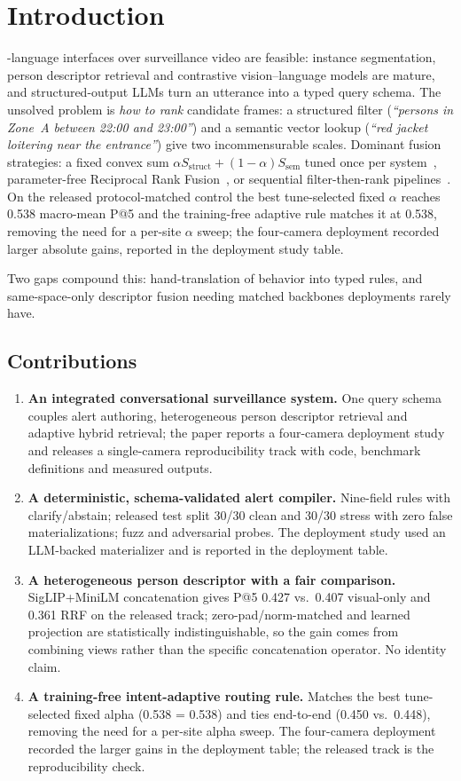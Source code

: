 ﻿\documentclass[conference]{IEEEtran}
\theoremstyle{plain}
\begin{document}
\section{Introduction}

-language interfaces over surveillance video are feasible: instance segmentation, person descriptor retrieval and contrastive vision--language models are mature, and structured-output LLMs turn an utterance into a typed query schema. The unsolved problem is \emph{how to rank} candidate frames: a structured filter (\textit{``persons in Zone~A between 22:00 and 23:00''}) and a semantic vector lookup (\textit{``red jacket loitering near the entrance''}) give two incommensurable scales. Dominant fusion strategies: a fixed convex sum $\alpha S_{\text{struct}} + (1-\alpha) S_{\text{sem}}$ tuned once per system~\cite{b7,b12,b29}, parameter-free Reciprocal Rank Fusion~\cite{b27}, or sequential filter-then-rank pipelines~\cite{b30}. On the released protocol-matched control the best tune-selected fixed $\alpha$ reaches 0.538 macro-mean P@5 and the training-free adaptive rule matches it at 0.538, removing the need for a per-site $\alpha$ sweep; the four-camera deployment recorded larger absolute gains, reported in the deployment study table.

Two gaps compound this: hand-translation of behavior into typed rules, and same-space-only descriptor fusion needing matched backbones deployments rarely have.

\subsection*{Contributions}
\begin{enumerate}
\item \textbf{An integrated conversational surveillance system.} One query schema couples alert authoring, heterogeneous person descriptor retrieval and adaptive hybrid retrieval; the paper reports a four-camera deployment study and releases a single-camera reproducibility track with code, benchmark definitions and measured outputs.
\item \textbf{A deterministic, schema-validated alert compiler.} Nine-field rules with clarify/abstain; released test split 30/30 clean and 30/30 stress with zero false materializations; fuzz and adversarial probes. The deployment study used an LLM-backed materializer and is reported in the deployment table.
\item \textbf{A heterogeneous person descriptor with a fair comparison.} SigLIP+MiniLM concatenation gives P@5 0.427 vs.\ 0.407 visual-only and 0.361 RRF on the released track; zero-pad/norm-matched and learned projection are statistically indistinguishable, so the gain comes from combining views rather than the specific concatenation operator. No identity claim.
\item \textbf{A training-free intent-adaptive routing rule.} Matches the best tune-selected fixed alpha (0.538 = 0.538) and ties end-to-end (0.450 vs.\ 0.448), removing the need for a per-site alpha sweep. The four-camera deployment recorded the larger gains in the deployment table; the released track is the reproducibility check.
\end{enumerate}
\end{document}
